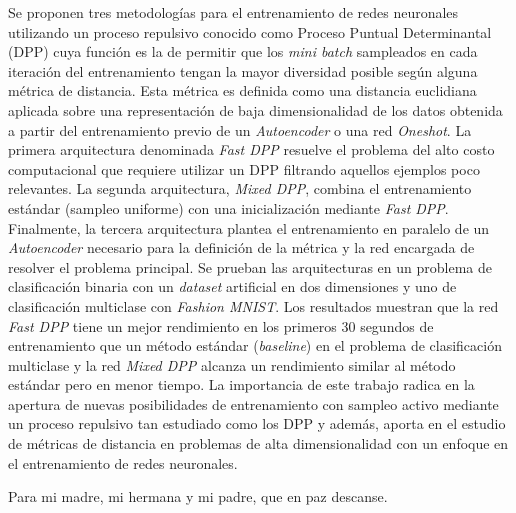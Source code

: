 \documentclass[
	spanish, %
	letterpaper, oneside
]{book}
\begin{document}
	
\templatePortrait

\templatePagecfg


\begin{abstractd}

Se proponen tres metodologías para el entrenamiento de redes neuronales utilizando un proceso repulsivo conocido como Proceso Puntual Determinantal (DPP) cuya función es la de permitir que los \textit{mini batch} sampleados en cada iteración del entrenamiento tengan la mayor diversidad posible según alguna métrica de distancia. Esta métrica es definida como una distancia euclidiana aplicada sobre una representación de baja dimensionalidad de los datos obtenida a partir del entrenamiento previo de un \textit{Autoencoder} o una red \textit{Oneshot}. La primera arquitectura denominada \textit{Fast DPP} resuelve el problema del alto costo computacional que requiere utilizar un DPP filtrando aquellos ejemplos poco relevantes. La segunda arquitectura, \textit{Mixed DPP}, combina el entrenamiento estándar (sampleo uniforme) con una inicialización mediante \textit{Fast DPP}. Finalmente, la tercera arquitectura plantea el entrenamiento en paralelo de un \textit{Autoencoder} necesario para la definición de la métrica y la red encargada de resolver el problema principal. Se prueban las arquitecturas en un problema de clasificación binaria con un \textit{dataset} artificial en dos dimensiones y uno de clasificación multiclase con \textit{Fashion MNIST}. Los resultados muestran que la red \textit{Fast DPP} tiene un mejor rendimiento en los primeros 30 segundos de entrenamiento que un método estándar (\textit{baseline}) en el problema de clasificación multiclase y la red \textit{Mixed DPP} alcanza un rendimiento similar al método estándar pero en menor tiempo. La importancia de este trabajo radica en la apertura de nuevas posibilidades de entrenamiento con sampleo activo mediante un proceso repulsivo tan estudiado como los DPP y además, aporta en el estudio de métricas de distancia en problemas de alta dimensionalidad con un enfoque en el entrenamiento de redes neuronales.

\end{abstractd}

\begin{dedicatory}
	Para mi madre, mi hermana y mi padre, que en paz descanse. \\
\end{dedicatory}
\end{document}
